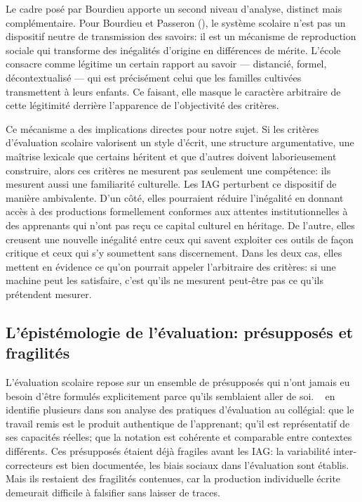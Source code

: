 Le cadre posé par Bourdieu apporte un second niveau d'analyse, distinct mais
complémentaire. 
Pour Bourdieu et Passeron (\citeyear{pluet1971pierre}), le système scolaire n'est pas un dispositif neutre de transmission des savoirs: il est un mécanisme de reproduction sociale qui transforme des inégalités d'origine en différences de mérite. 
L'école consacre comme légitime un certain rapport au savoir --- distancié, formel, décontextualisé --- qui est précisément celui que les familles cultivées transmettent à leurs enfants. 
Ce faisant, elle masque le caractère arbitraire de cette légitimité derrière l'apparence de l'objectivité des critères.

Ce mécanisme a des implications directes pour notre sujet. 
Si les critères d'évaluation scolaire valorisent un style d'écrit, une structure argumentative, une maîtrise lexicale que certains héritent et que d'autres doivent laborieusement construire, alors ces critères ne mesurent pas seulement une compétence: ils mesurent aussi une familiarité culturelle.
Les IAG perturbent ce dispositif de manière ambivalente. 
D'un côté, elles pourraient réduire l'inégalité en donnant accès à des productions formellement conformes aux attentes institutionnelles à des apprenants qui n'ont pas reçu ce capital culturel en héritage. 
De l'autre, elles creusent une nouvelle inégalité entre ceux qui savent exploiter ces outils de façon critique et ceux qui s'y soumettent sans discernement. 
Dans les deux cas, elles mettent en évidence ce qu'on pourrait appeler l'arbitraire des critères: si une machine peut les satisfaire, c'est qu'ils ne mesurent peut-être pas ce qu'ils prétendent mesurer.

\subsection{L'épistémologie de l'évaluation: présupposés et fragilités}

L'évaluation scolaire repose sur un ensemble de présupposés qui n'ont jamais eu besoin d'être formulés explicitement parce qu'ils semblaient aller de soi.%
~\cite{leroux2015evaluer} en identifie plusieurs dans son analyse des pratiques d'évaluation au collégial: que le travail remis est le produit authentique de l'apprenant; qu'il est représentatif de ses capacités réelles; que la notation est cohérente et comparable entre contextes différents. 
Ces présupposés étaient déjà fragiles avant les IAG: la variabilité inter-correcteurs est bien documentée, les biais sociaux dans l'évaluation sont établis. %
Mais ils restaient des fragilités contenues, car la production individuelle écrite demeurait difficile à falsifier sans laisser de traces.

